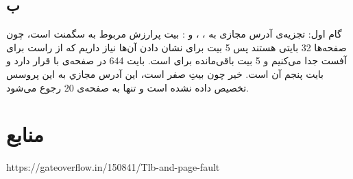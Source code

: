 \documentclass{article}
\begin{document}
\subsection{ب}
گام اول: تجزیه‌ی آدرس مجازی به ، ، و :
 بیت پرارزش مربوط به سگمنت است، چون صفحه‌ها 32 بایتی هستند پس 5 بیت برای نشان دادن آن‌ها نیاز داریم که از راست برای آفست جدا می‌کنیم و 5 بیت باقی‌مانده برای  است.
\newline
{}
\newline
{}
\newline
{}
\newline
{}
\newline
\newline
{}
\newline
بایت 644 در صفحه‌ی با  قرار دارد و بایت پنجم آن است.
\newline
{}
\newline
{}
\newline
{}
\newline
خیر چون بیتِ  صفر است، اين آدرس مجازي به اين پروسس تخصيص داده نشده است و تنها به صفحه‌ی 20 رجوع می‌شود.

\section*{منابع}
\renewcommand{\section}[2]{}%
\begin{thebibliography}{99} %


\begin{LTRitems}

\resetlatinfont

https://gateoverflow.in/150841/Tlb-and-page-fault

\end{LTRitems}

\end{thebibliography}
\end{document}
